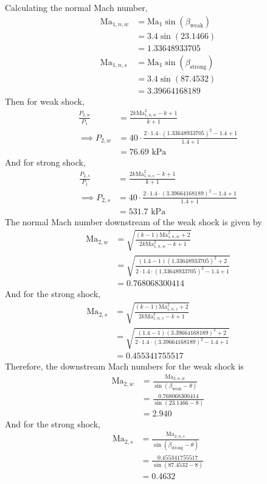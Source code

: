 Calculating the normal Mach number,
\begin{align*}
    \text{Ma}_{1, n, w} &= \text{Ma}_1 \sin (\beta_{\text{weak}}) \\
    &= 3.4 \sin (23.1466) \\
    &= 1.33648933705 \\
    \text{Ma}_{1, n, s} &= \text{Ma}_1 \sin (\beta_{\text{strong}}) \\
    &= 3.4 \sin (87.4532) \\
    &= 3.39664168189
\end{align*}
Then for weak shock, 
\begin{align*}
    \frac{P_{2, w}}{P_1} &= \frac{2 k \text{Ma}_{1, n, w}^2 - k + 1}{k + 1} \\
    \implies P_{2, w} &= 40 \cdot \frac{2 \cdot 1.4 \cdot (1.33648933705)^2 - 1.4 + 1}{1.4 + 1} \\
    &= \boxed{76.69 \text{ kPa}}
\end{align*}
And for strong shock,
\begin{align*}
    \frac{P_{2, s}}{P_1} &= \frac{2 k \text{Ma}_{1, n, s}^2 - k + 1}{k + 1} \\
    \implies P_{2, s} &= 40 \cdot \frac{2 \cdot 1.4 \cdot (3.39664168189)^2 - 1.4 + 1}{1.4 + 1} \\
    &= \boxed{531.7 \text{ kPa}}
\end{align*}
The normal Mach number downstream of the weak shock is given by
\begin{align*}
    \text{Ma}_{2, w} &= \sqrt{\frac{(k - 1) \text{Ma}_{1, n, w}^2 + 2}{2k \text{Ma}_{1, n, w}^2 - k + 1}} \\
    &= \sqrt{\frac{(1.4 - 1) (1.33648933705)^2 + 2}{2 \cdot 1.4 \cdot (1.33648933705)^2 - 1.4 + 1}} \\
    &= 0.768068300414
\end{align*}
And for the strong shock,
\begin{align*}
    \text{Ma}_{2, s} &= \sqrt{\frac{(k - 1) \text{Ma}_{1, n, s}^2 + 2}{2k \text{Ma}_{1, n, s}^2 - k + 1}} \\
    &= \sqrt{\frac{(1.4 - 1) (3.39664168189)^2 + 2}{2 \cdot 1.4 \cdot (3.39664168189)^2 - 1.4 + 1}} \\
    &= 0.455341755517
\end{align*}
Therefore, the downstream Mach numbers for the weak shock is 
\begin{align*}
    \text{Ma}_{2, w} &= \frac{\text{Ma}_{2, n, w}}{\sin (\beta_{\text{weak}} - \theta)} \\
    &= \frac{0.768068300414}{\sin (23.1466 - 8)} \\
    &= \boxed{2.940}
\end{align*}
And for the strong shock,
\begin{align*}
    \text{Ma}_{2, s} &= \frac{\text{Ma}_{2, n, s}}{\sin (\beta_{\text{strong}} - \theta)} \\
    &= \frac{0.455341755517}{\sin (87.4532 - 8)} \\
    &= \boxed{0.4632}
\end{align*}

